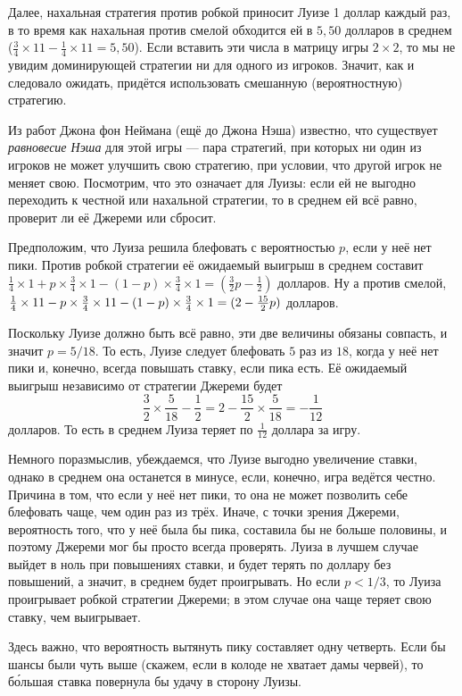 Далее, нахальная стратегия против робкой приносит Луизе 1 доллар каждый раз,
в то время как нахальная против смелой обходится ей в $5{,}50$ долларов в среднем ($\tfrac34 \times 11- \tfrac14 \times11 = 5{,}50$).
Если вставить эти числа в матрицу игры $2 \times 2$,
то мы не увидим доминирующей стратегии ни для одного из игроков.
Значит, как и следовало ожидать, придётся использовать смешанную (вероятностную) стратегию.

Из работ Джона фон Неймана (ещё до Джона Нэша) известно, что существует \emph{равновесие Нэша} для этой игры --- пара стратегий, при которых ни один из игроков не может улучшить свою стратегию, при условии, что другой игрок не меняет свою.
Посмотрим, что это означает для Луизы: если ей не выгодно переходить к честной или нахальной стратегии, то в среднем ей всё равно, проверит ли её Джереми или сбросит.

Предположим, что Луиза решила блефовать с вероятностью $p$, если у неё нет пики.
Против робкой стратегии её ожидаемый выигрыш в среднем составит $\tfrac14 \times 1 + p \times \tfrac34 \times 1 - (1 - p) \times \tfrac34 \times 1 =(\tfrac32p - \tfrac12)$ долларов.
Ну а против смелой, $\tfrac14 \times 11 - p \times \tfrac34 \times 11 - (1 - p) \times \tfrac34 \times 1 \z= (2 - \tfrac{15}2p)$ долларов.

Поскольку Луизе должно быть всё равно, эти две величины обязаны совпасть, и значит $p = 5/18$.
То есть, Луизе следует блефовать $5$ раз из $18$, когда у неё нет пики и, конечно, всегда повышать ставку, если пика есть.
Её ожидаемый выигрыш независимо от стратегии Джереми будет
\[\frac32\times\frac5{18}-\frac12=2-\frac{15}2\times\frac5{18}=-\frac1{12}\]
долларов.
То есть в среднем Луиза теряет по $\tfrac1{12}$ доллара за игру.

Немного поразмыслив, убеждаемся, что Луизе выгодно увеличение ставки,
однако в среднем она останется в минусе, если, конечно, игра ведётся честно.
Причина в том, что если у неё нет пики, то она не может позволить себе блефовать чаще, чем один раз из трёх.
Иначе, с точки зрения Джереми, вероятность того, что у неё была бы пика, составила бы не больше половины, и поэтому Джереми мог бы просто всегда проверять.
Луиза в лучшем случае выйдет в ноль при повышениях ставки, и будет терять по доллару без повышений, а значит, в среднем будет проигрывать.
Но если $p < 1/3$, то Луиза проигрывает робкой стратегии Джереми;
в этом случае она чаще теряет свою ставку, чем выигрывает.

Здесь важно, что вероятность вытянуть пику составляет одну четверть.
Если бы шансы были чуть выше (скажем, если в колоде не хватает дамы червей), то б\'{о}льшая ставка повернула бы удачу в сторону Луизы.

